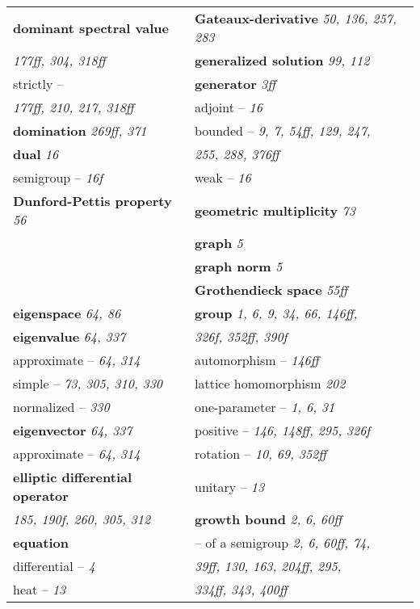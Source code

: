 \begin{longtable}{p{}p{}}
\textbf{dominant spectral value} & \textbf{Gateaux-derivative} \textit{50, 136, 257, 283} \\
\quad \textit{177ff, 304, 318ff} & \textbf{generalized solution} \textit{99, 112} \\
\quad strictly -- & \textbf{generator} \textit{3ff} \\
\quad\quad \textit{177ff, 210, 217, 318ff} & \quad adjoint -- \textit{16} \\
\textbf{domination} \textit{269ff, 371} & \quad bounded -- \textit{9, 7, 54ff, 129, 247,} \\
\textbf{dual} \textit{16} & \quad\quad \textit{255, 288, 376ff} \\
\quad semigroup -- \textit{16f} & \quad weak -- \textit{16} \\
\textbf{Dunford-Pettis property} \textit{56} & \textbf{geometric multiplicity} \textit{73} \\
& \textbf{graph} \textit{5} \\
& \textbf{graph norm} \textit{5} \\
& \textbf{Grothendieck space} \textit{55ff} \\
\textbf{eigenspace} \textit{64, 86} & \textbf{group} \textit{1, 6, 9, 34, 66, 146ff,} \\
\textbf{eigenvalue} \textit{64, 337} & \quad\quad \textit{326f, 352ff, 390f} \\
\quad approximate -- \textit{64, 314} & \quad automorphism -- \textit{146ff} \\
\quad simple -- \textit{73, 305, 310, 330} & \quad lattice homomorphism \textit{202} \\
\quad normalized -- \textit{330} & \quad one-parameter -- \textit{1, 6, 31} \\
\textbf{eigenvector} \textit{64, 337} & \quad positive -- \textit{146, 148ff, 295, 326f} \\
\quad approximate -- \textit{64, 314} & \quad rotation -- \textit{10, 69, 352ff} \\
\textbf{elliptic differential operator} & \quad unitary -- \textit{13} \\
\quad \textit{185, 190f, 260, 305, 312} & \textbf{growth bound} \textit{2, 6, 60ff} \\
\textbf{equation} & \quad -- of a semigroup \textit{2, 6, 60ff, 74,} \\
\quad differential -- \textit{4} & \quad\quad \textit{39ff, 130, 163, 204ff, 295,} \\
\quad heat -- \textit{13} & \quad\quad \textit{334ff, 343, 400ff} \\

\end{longtable}
